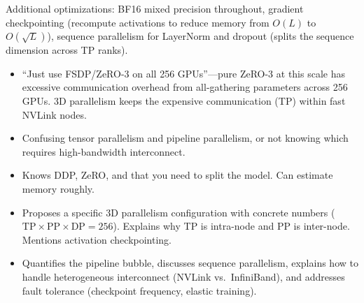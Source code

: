 \begin{interviewq}
Additional optimizations: BF16 mixed precision throughout, gradient checkpointing (recompute activations to reduce memory from $O(L)$ to $O(\sqrt{L})$), sequence parallelism for LayerNorm and dropout (splits the sequence dimension across TP ranks).

\redflags
\begin{itemize}
    \item ``Just use FSDP/ZeRO-3 on all 256 GPUs''---pure ZeRO-3 at this scale has excessive communication overhead from all-gathering parameters across 256 GPUs. 3D parallelism keeps the expensive communication (TP) within fast NVLink nodes.
    \item Confusing tensor parallelism and pipeline parallelism, or not knowing which requires high-bandwidth interconnect.
\end{itemize}


\goodgreat
\begin{itemize}
    \item {} Knows DDP, ZeRO, and that you need to split the model. Can estimate memory roughly.
    \item {} Proposes a specific 3D parallelism configuration with concrete numbers ($\text{TP} \times \text{PP} \times \text{DP} = 256$). Explains why TP is intra-node and PP is inter-node. Mentions activation checkpointing.
    \item {} Quantifies the pipeline bubble, discusses sequence parallelism, explains how to handle heterogeneous interconnect (NVLink vs.\ InfiniBand), and addresses fault tolerance (checkpoint frequency, elastic training).
\end{itemize}

\end{interviewq}

